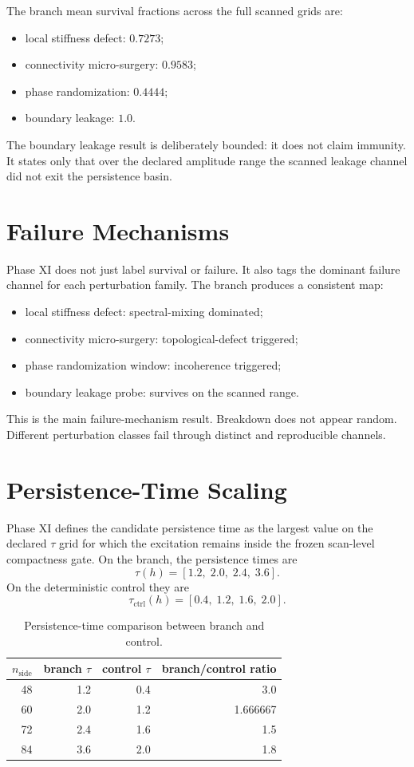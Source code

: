 \documentclass[11pt]{article}
\begin{document}
The branch mean survival fractions across the full scanned grids are:
\begin{itemize}
\item local stiffness defect: $0.7273$;
\item connectivity micro-surgery: $0.9583$;
\item phase randomization: $0.4444$;
\item boundary leakage: $1.0$.
\end{itemize}

The boundary leakage result is deliberately bounded: it does not claim immunity. It states only that over the declared amplitude range the scanned leakage channel did not exit the persistence basin.

\section{Failure Mechanisms}

Phase XI does not just label survival or failure. It also tags the dominant failure channel for each perturbation family. The branch produces a consistent map:
\begin{itemize}
\item local stiffness defect: spectral-mixing dominated;
\item connectivity micro-surgery: topological-defect triggered;
\item phase randomization window: incoherence triggered;
\item boundary leakage probe: survives on the scanned range.
\end{itemize}

This is the main failure-mechanism result. Breakdown does not appear random. Different perturbation classes fail through distinct and reproducible channels.

\section{Persistence-Time Scaling}

Phase XI defines the candidate persistence time as the largest value on the declared $\tau$ grid for which the excitation remains inside the frozen scan-level compactness gate. On the branch, the persistence times are
\[
\tau(h) = [1.2,\;2.0,\;2.4,\;3.6].
\]
On the deterministic control they are
\[
\tau_{\mathrm{ctrl}}(h) = [0.4,\;1.2,\;1.6,\;2.0].
\]

\begin{table}[t]
\centering
\small
\begin{tabular}{@{}rrrr@{}}
\toprule
$n_{\mathrm{side}}$ & branch $\tau$ & control $\tau$ & branch/control ratio \\
\midrule
48 & 1.2 & 0.4 & 3.0 \\
60 & 2.0 & 1.2 & 1.666667 \\
72 & 2.4 & 1.6 & 1.5 \\
84 & 3.6 & 2.0 & 1.8 \\
\bottomrule
\end{tabular}
\caption{Persistence-time comparison between branch and control.}
\label{tab:tau_scaling}
\end{table}
\end{document}
